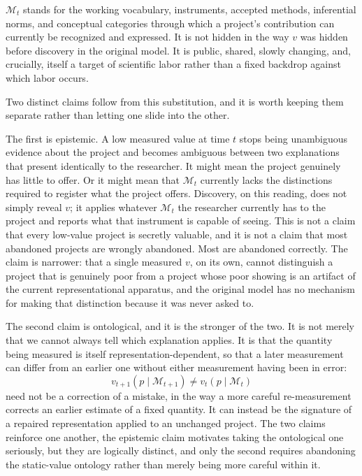 \documentclass[11pt]{article}
\begin{document}
$\mathcal{M}_t$ stands for the working vocabulary, instruments, accepted methods, inferential norms, and conceptual categories through which a project's contribution can currently be recognized and expressed. It is not hidden in the way $v$ was hidden before discovery in the original model. It is public, shared, slowly changing, and, crucially, itself a target of scientific labor rather than a fixed backdrop against which labor occurs.

Two distinct claims follow from this substitution, and it is worth keeping them separate rather than letting one slide into the other.

The first is epistemic. A low measured value at time $t$ stops being unambiguous evidence about the project and becomes ambiguous between two explanations that present identically to the researcher. It might mean the project genuinely has little to offer. Or it might mean that $\mathcal{M}_t$ currently lacks the distinctions required to register what the project offers. Discovery, on this reading, does not simply reveal $v$; it applies whatever $\mathcal{M}_t$ the researcher currently has to the project and reports what that instrument is capable of seeing. This is not a claim that every low-value project is secretly valuable, and it is not a claim that most abandoned projects are wrongly abandoned. Most are abandoned correctly. The claim is narrower: that a single measured $v$, on its own, cannot distinguish a project that is genuinely poor from a project whose poor showing is an artifact of the current representational apparatus, and the original model has no mechanism for making that distinction because it was never asked to.

The second claim is ontological, and it is the stronger of the two. It is not merely that we cannot always tell which explanation applies. It is that the quantity being measured is itself representation-dependent, so that a later measurement can differ from an earlier one without either measurement having been in error:
\[
v_{t+1}(p \mid \mathcal{M}_{t+1}) \neq v_t(p \mid \mathcal{M}_t)
\]
need not be a correction of a mistake, in the way a more careful re-measurement corrects an earlier estimate of a fixed quantity. It can instead be the signature of a repaired representation applied to an unchanged project. The two claims reinforce one another, the epistemic claim motivates taking the ontological one seriously, but they are logically distinct, and only the second requires abandoning the static-value ontology rather than merely being more careful within it.
\end{document}
